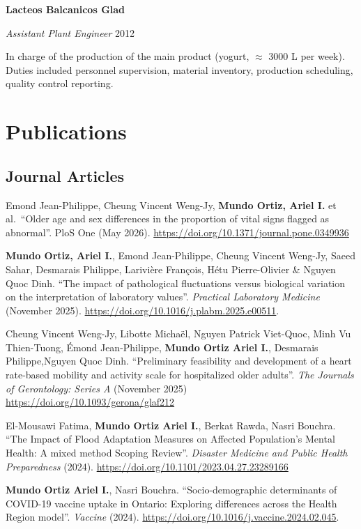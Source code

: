 \documentclass[10pt,]{article}
\providecommand{\tightlist}{%
  \setlength{\itemsep}{0pt}\setlength{\parskip}{0pt}}
\renewenvironment{itemize}{
  \begin{list}{}{
    \setlength{\leftmargin}{1.5em}
  }
}{
  \end{list}
}
\begin{document}
\textbf{Lacteos Balcanicos Glad}

\emph{Assistant Plant Engineer} \hfill 2012

\begin{itemize}
\tightlist
\item
  In charge of the production of the main product (yogurt, \(\approx\)
  3000 L per week). Duties included personnel supervision, material
  inventory, production scheduling, quality control reporting.
\end{itemize}

\section{Publications}\label{publications}

\subsection{Journal Articles}\label{journal-articles}

Emond Jean-Philippe, Cheung Vincent Weng-Jy, \textbf{Mundo Ortiz, Ariel
I.} et al.~``Older age and sex differences in the proportion of vital
signs flagged as abnormal''. PloS One (May 2026).
\url{https://doi.org/10.1371/journal.pone.0349936}

\textbf{Mundo Ortiz, Ariel I.}, Emond Jean-Philippe, Cheung Vincent
Weng-Jy, Saeed Sahar, Desmarais Philippe, Larivière François, Hétu
Pierre-Olivier \& Nguyen Quoc Dinh. ``The impact of pathological
fluctuations versus biological variation on the interpretation of
laboratory values''. \emph{Practical Laboratory Medicine} (November
2025). \url{https://doi.org/10.1016/j.plabm.2025.e00511}.

Cheung Vincent Weng-Jy, Libotte Michaël, Nguyen Patrick Viet-Quoc, Minh
Vu Thien-Tuong, Émond Jean-Philippe, \textbf{Mundo Ortiz Ariel I.},
Desmarais Philippe,Nguyen Quoc Dinh. ``Preliminary feasibility and
development of a heart rate-based mobility and activity scale for
hospitalized older adults''. \emph{The Journals of Gerontology: Series
A} (November 2025) \url{https://doi.org/10.1093/gerona/glaf212}

El-Mousawi Fatima, \textbf{Mundo Ortiz Ariel I.}, Berkat Rawda, Nasri
Bouchra. ``The Impact of Flood Adaptation Measures on Affected
Population's Mental Health: A mixed method Scoping Review''.
\emph{Disaster Medicine and Public Health Preparedness} (2024).
\url{https://doi.org/10.1101/2023.04.27.23289166}

\textbf{Mundo Ortiz Ariel I.}, Nasri Bouchra. ``Socio-demographic
determinants of COVID-19 vaccine uptake in Ontario: Exploring
differences across the Health Region model''. \emph{Vaccine} (2024).
\url{https://doi.org/10.1016/j.vaccine.2024.02.045}.
\end{document}
